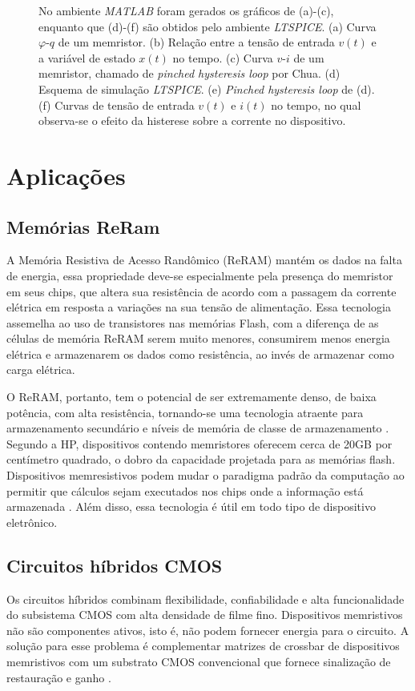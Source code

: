 \documentclass{ceel}
\begin{document}
\begin{multicols}{2}
\begin{figure}[ht]
\caption{No ambiente \textit{MATLAB} foram gerados os gráficos de (a)-(c), enquanto que (d)-(f) são obtidos pelo ambiente \textit{LTSPICE}. (a) Curva $\varphi$-$q$ de um memristor. (b) Relação entre a tensão de entrada $v(t)$ e a variável de estado $x(t)$ no tempo. (c) Curva $v$-$i$ de um memristor, chamado de \emph{pinched hysteresis loop} por Chua. (d) Esquema de simulação \textit{LTSPICE}. (e) \emph{Pinched hysteresis loop} de (d). (f) Curvas de tensão de entrada $v(t)$ e $i(t)$ no tempo, no qual observa-se o efeito da histerese sobre a corrente no dispositivo.}\label{simulacao}
\end{figure}


\section{Aplicações}\label{aplicacoes}
\subsection{Memórias ReRam}
A Memória Resistiva de Acesso Randômico (ReRAM) mantém os dados na falta de energia, essa propriedade deve-se especialmente pela presença do memristor em seus chips, que altera sua resistência de acordo com a passagem da corrente elétrica em resposta a variações na sua tensão de alimentação.
Essa tecnologia assemelha ao uso de transistores nas memórias Flash, com a diferença de as células de memória ReRAM serem muito menores, consumirem menos energia elétrica e armazenarem os dados como resistência, ao invés de armazenar como carga elétrica.

O ReRAM, portanto, tem o potencial de ser extremamente denso, de baixa potência, com alta resistência, tornando-se uma tecnologia atraente para armazenamento secundário e níveis de memória de classe de armazenamento \cite{prog}. Segundo a HP, dispositivos contendo memristores oferecem cerca de 20GB por centímetro quadrado, o dobro da capacidade projetada para as memórias flash.
Dispositivos memresistivos podem mudar o paradigma padrão da computação ao permitir que cálculos sejam executados nos chips onde a informação está armazenada \cite{hp}. Além disso, essa tecnologia é útil em todo tipo de dispositivo eletrônico.

\subsection{Circuitos híbridos CMOS} %
Os circuitos híbridos combinam flexibilidade, confiabilidade e alta funcionalidade do subsistema CMOS com alta densidade de filme fino. Dispositivos memristivos não são componentes ativos, isto é, não podem fornecer energia para o circuito. A solução para esse problema é complementar matrizes de crossbar de dispositivos memristivos com um substrato CMOS convencional que fornece sinalização de restauração e ganho \cite{um}\cite{dois}.


\end{multicols}
\end{document}
